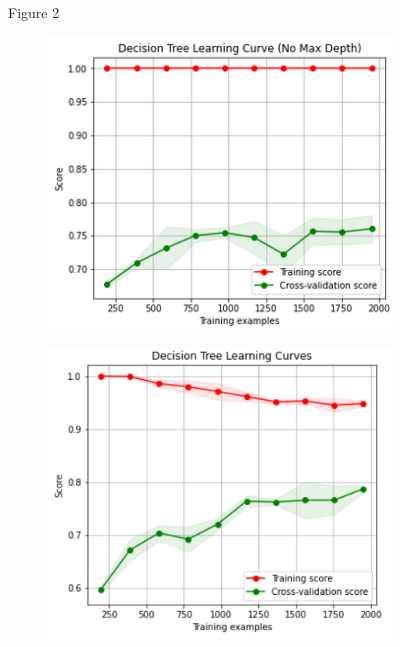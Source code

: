 \documentclass{article}
\begin{document}
\begin{figure}
\centering
Figure 2
\begin{subfigure}{.5\textwidth}
\centering
\includegraphics[width=\linewidth]{poland_decision_learning_curve_without_max_depth.png}

\end{subfigure}%
\begin{subfigure}{.5\textwidth}
\centering
\includegraphics[width=\linewidth]{poland_decision_learning_curve_with_max_depth.png}

\end{subfigure}
\label{fig:test}
\end{figure}
\end{document}
